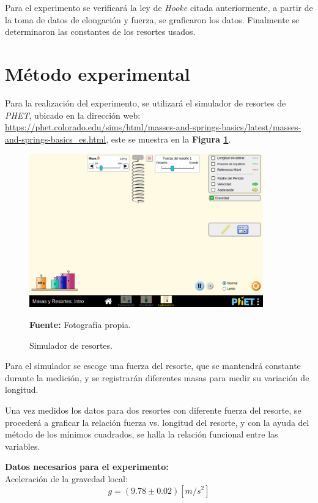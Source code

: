 \documentclass[letter,11pt]{article}
\newcommand{\source}[1]{\vspace{-11pt} \caption*{\small{\textbf{Fuente:} {#1}}}}
\begin{document}
Para el experimento se verificará la ley de \emph{Hooke} citada anteriormente,
a partir de la toma de datos de elongación y fuerza, se graficaron los datos.
Finalmente se determinaron las constantes de los resortes usados.

\section{Método experimental}

Para la realización del experimento, se utilizará el simulador de resortes de
\emph{PHET}, ubicado en la dirección web:
\url{https://phet.colorado.edu/sims/html/masses-and-springs-basics/latest/masses-and-springs-basics_es.html},
este se muestra en la \textbf{Figura \ref{figura2}}.

\begin{figure}
\centering
\includegraphics[width=0.90\textwidth]{resources/f2.eps}
\caption{Simulador de resortes.}
\label{figura2}
\source{Fotografía propia.}
\end{figure}

Para el simulador se escoge una fuerza del resorte, que se mantendrá constante
durante la medición, y se registrarán diferentes masas para medir su variación
de longitud.

Una vez medidos los datos para dos resortes con diferente fuerza del resorte,
se procederá a graficar la relación fuerza vs. longitud del resorte, y con la
ayuda del método de los mínimos cuadrados, se halla la relación funcional entre
las variables.

\vspace{0.35cm}
\textbf{Datos necesarios para el experimento:} \\

Aceleración de la gravedad local:
\begin{equation*}
    g = (9.78 \pm 0.02)[m/s^2]
\end{equation*}
\end{document}
